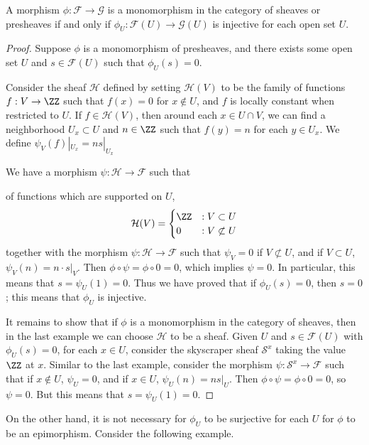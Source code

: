 \begin{lemma}
    A morphism $\phi: \mathcal{F} \to \mathcal{G}$ is a monomorphism in the category of sheaves or presheaves if and only if $\phi_U: \mathcal{F}(U) \to \mathcal{G}(U)$ is injective for each open set $U$.
\end{lemma}
\begin{proof}
    Suppose $\phi$ is a monomorphism of presheaves, and there exists some open set $U$ and $s \in \mathcal{F}(U)$ such that $\phi_U(s) = 0$.


    Consider the sheaf $\mathcal{H}$ defined by setting $\mathcal{H}(V)$ to be the family of functions $f: V \to \ZZ$ such that $f(x) = 0$ for $x \not \in U$, and $f$ is locally constant when restricted to $U$. If $f \in \mathcal{H}(V)$, then around each $x \in U \cap V$, we can find a neighborhood $U_x \subset U$ and $n \in \ZZ$ such that $f(y) = n$ for each $y \in U_x$. We define $\psi_V(f)|_{U_x} = n s|_{U_x}$

     We have a morphism $\psi: \mathcal{H} \to \mathcal{F}$ such that 

    of functions which are supported on $U$, 
    \[ \mathcal{H}(V) = \begin{cases} \ZZ &: V \subset U \\ 0 &: V \not \subset U \end{cases} \]
    together with the morphism $\psi: \mathcal{H} \to \mathcal{F}$ such that $\psi_V = 0$ if $V \not \subset U$, and if $V \subset U$, $\psi_V(n) = n \cdot s|_V$. Then $\phi \circ \psi = \phi \circ 0 = 0$, which implies $\psi = 0$. In particular, this means that $s = \psi_U(1) = 0$. Thus we have proved that if $\phi_U(s) = 0$, then $s = 0$; this means that $\phi_U$ is injective.

    It remains to show that if $\phi$ is a monomorphism in the category of sheaves, then in the last example we can choose $\mathcal{H}$ to be a sheaf. Given $U$ and $s \in \mathcal{F}(U)$ with $\phi_U(s) = 0$, for each $x \in U$, consider the skyscraper sheaf $\mathcal{S}^x$ taking the value $\ZZ$ at $x$. Similar to the last example, consider the morphism $\psi: \mathcal{S}^x \to \mathcal{F}$ such that if $x \not \in U$, $\psi_U = 0$, and if $x \in U$, $\psi_U(n) = ns|_U$. Then $\phi \circ \psi = \phi \circ 0 = 0$, so $\psi = 0$. But this means that $s = \psi_U(1) = 0$. 
\end{proof}

On the other hand, it is not necessary for $\phi_U$ to be surjective for each $U$ for $\phi$ to be an epimorphism. Consider the following example.

